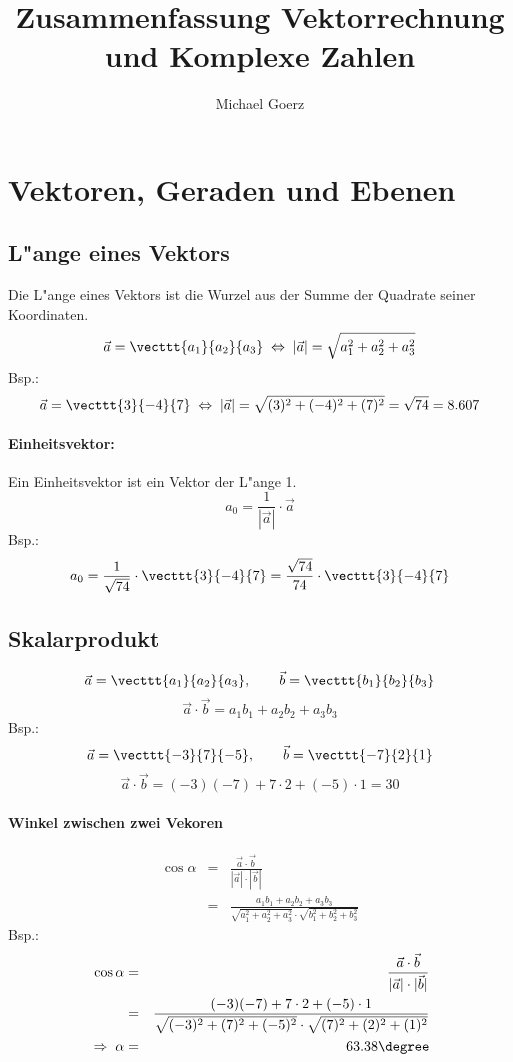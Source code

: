 \documentclass[a4paper]{article}
\title{Zusammenfassung Vektorrechnung und Komplexe Zahlen}
\author{Michael Goerz}
\begin{document}
\maketitle
\tableofcontents

\section{Vektoren, Geraden und Ebenen}

\subsection{L"ange eines Vektors}
Die L"ange eines Vektors ist die Wurzel aus der Summe der Quadrate seiner Koordinaten.
$$\vec{a} = \vecttt{a_1}{a_2}{a_3} \;\Leftrightarrow\; \vert \vec{a} \vert = \sqrt{a_1^2 + a_2^2 + a_3^2}$$
Bsp.:
$$\vec{a} = \vecttt{3}{-4}{7} \;\Leftrightarrow\; \vert \vec{a} \vert = \sqrt{(3)^2 + (-4)^2 + (7)^2} = \sqrt{74} = 8.607$$
\paragraph{Einheitsvektor:}
Ein Einheitsvektor ist ein Vektor der L"ange 1.
$$a_0 = \frac{1}{|\vec{a}|} \cdot \vec{a}$$
Bsp.:
$$a_0 = \frac{1}{\sqrt{74}} \cdot \vecttt{3}{-4}{7} = \frac{\sqrt{74}}{74} \cdot \vecttt{3}{-4}{7}$$

\subsection{Skalarprodukt}
$$\vec{a} = \vecttt{a_1}{a_2}{a_3}, \qquad \vec{b} = \vecttt{b_1}{b_2}{b_3}$$
$$\vec{a} \cdot \vec{b} = a_1b_1 + a_2b_2 + a_3b_3$$
Bsp.:
$$\vec{a} = \vecttt{-3}{7}{-5}, \qquad \vec{b} = \vecttt{-7}{2}{1}$$
$$\vec{a} \cdot \vec{b} = (-3)(-7) + 7 \cdot 2 + (-5) \cdot 1 = 30$$
\paragraph{Winkel zwischen zwei Vekoren}
\begin{eqnarray*}
\cos{\alpha} &=& \frac{\vec{a} \cdot \vec{b}}{|\vec{a}| \cdot |\vec{b}|}\\
             &=& \frac{a_1b_1 + a_2b_2 + a_3b_3}{\sqrt{a_1^2 + a_2^2 + a_3^2}\cdot\sqrt{b_1^2 + b_2^2 + b_3^2}}
\end{eqnarray*}
Bsp.:
\begin{eqnarray*}
\cos{\alpha} &=& \frac{\vec{a} \cdot \vec{b}}{|\vec{a}| \cdot |\vec{b}|} \\
             &=& \frac{(-3)(-7) + 7 \cdot 2 + (-5) \cdot 1}{\sqrt{(-3)^2 + (7)^2 + (-5)^2}\cdot\sqrt{(7)^2 + (2)^2 +(1)^2}}\\
 \;\Rightarrow\; \alpha &=& 63.38\degree
\end{eqnarray*}
\end{document}
